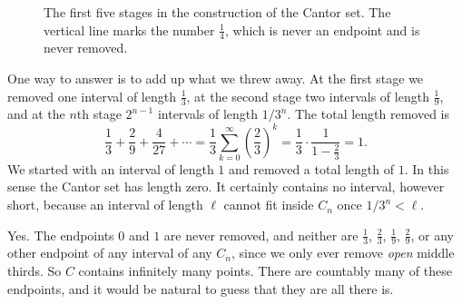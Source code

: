 \begin{figure}
\centering
{}
\caption{The first five stages in the construction of the Cantor set.  The vertical line marks the number $\frac14$, which is never an endpoint and is never removed.}
\label{fig:cantor}
\end{figure}

  One way to answer is to add up what we threw away.  At the first stage we removed one interval of length $\frac13$, at the second stage two intervals of length $\frac19$, and at the $n$th stage $2^{n-1}$ intervals of length $1/3^n$.  The total length removed is
\[ \frac13 + \frac29 + \frac{4}{27} + \cdots = \frac13 \sum_{k=0}^{\infty} \left(\frac23\right)^{k} = \frac13 \cdot \frac{1}{1 - \frac23} = 1. \]
We started with an interval of length $1$ and removed a total length of $1$.  In this sense the Cantor set has length zero.  It certainly contains no interval, however short, because an interval of length $\ell$ cannot fit inside $C_n$ once $1/3^n < \ell$.

  Yes.  The endpoints $0$ and $1$ are never removed, and neither are $\frac13$, $\frac23$, $\frac19$, $\frac29$, or any other endpoint of any interval of any $C_n$, since we only ever remove \emph{open} middle thirds.  So $C$ contains infinitely many points.  There are countably many of these endpoints, and it would be natural to guess that they are all there is.

